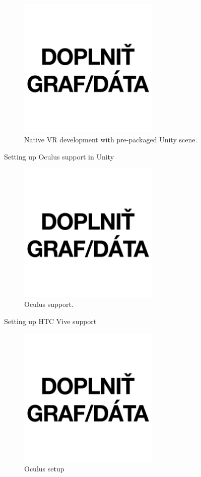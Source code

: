 \begin{figure}[!ht]
	\centering
	\includegraphics[width=0.6\textwidth]{figures/empty.jpg}
	\caption{Native VR development with pre-packaged Unity scene.}
	\label{fig:unity-native-vr-dev}
\end{figure}

Setting up Oculus support in Unity

\begin{figure}[!ht]
	\centering
	\includegraphics[width=0.6\textwidth]{figures/empty.jpg}
	\caption{Oculus support.}
	\label{fig:unity-oculus-support}
\end{figure}

Setting up HTC Vive support

\begin{figure}[!ht]
	\centering
	\includegraphics[width=0.6\textwidth]{figures/empty.jpg}
	\caption{Oculus setup}
	\label{fig:unity-htc-support}
\end{figure}

